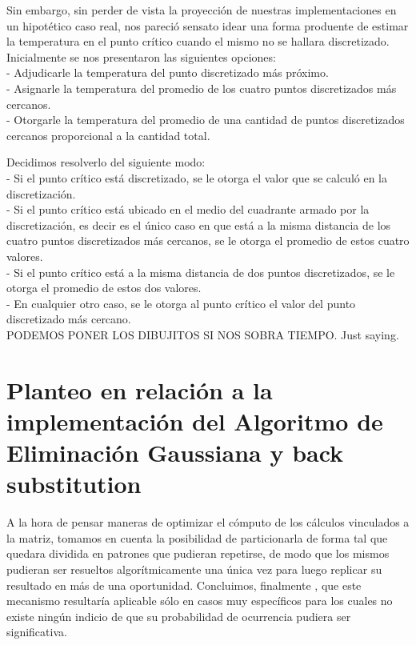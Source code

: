 \documentclass[double, 1.5in, 12pt]{beavtex}
\begin{document}
Sin embargo, sin perder de vista la proyecci\'on de nuestras implementaciones en un hipot\'etico caso real, nos pareci\'o sensato idear una forma produente de estimar la temperatura en el punto cr\'itico cuando el mismo no se hallara discretizado.
Inicialmente se nos presentaron las siguientes opciones: \\
- Adjudicarle la temperatura del punto discretizado m\'as pr\'oximo.\\
- Asignarle la temperatura del promedio de los cuatro puntos discretizados m\'as cercanos.\\
- Otorgarle la temperatura del promedio de una cantidad de puntos discretizados cercanos proporcional a la cantidad total.

Decidimos resolverlo del siguiente modo:\\
- Si el punto cr\'itico est\'a discretizado, se le otorga el valor que se calcul\'o en la discretizaci\'on. \\
- Si el punto cr\'itico est\'a ubicado en el medio del cuadrante armado por la discretizaci\'on, es decir es el \'unico caso en que est\'a a la misma distancia de los cuatro puntos discretizados m\'as cercanos, se le otorga el promedio de estos cuatro valores.\\
- Si el punto cr\'itico est\'a a la misma distancia de dos puntos discretizados, se le otorga el promedio de estos dos valores.\\
- En cualquier otro caso, se le otorga al punto cr\'itico el valor del punto discretizado m\'as cercano.\\

 {\color{red}
PODEMOS PONER LOS DIBUJITOS SI NOS SOBRA TIEMPO. Just saying.\\}


\section{Planteo en relaci\'on a la implementaci\'on del Algoritmo de Eliminaci\'on Gaussiana y back substitution}


A la hora de pensar maneras de optimizar el c\'omputo de los c\'alculos vinculados a la matriz, tomamos en cuenta la posibilidad de particionarla de forma tal que quedara dividida en patrones que pudieran repetirse, de modo que los mismos pudieran ser resueltos algor\'itmicamente una \'unica vez para luego replicar su resultado en m\'as de una oportunidad. Concluimos, finalmente , que este mecanismo resultar\'ia aplicable s\'olo en casos muy espec\'ificos para los cuales no existe ning\'un indicio de que su probabilidad de ocurrencia pudiera ser significativa. 
\end{document}
